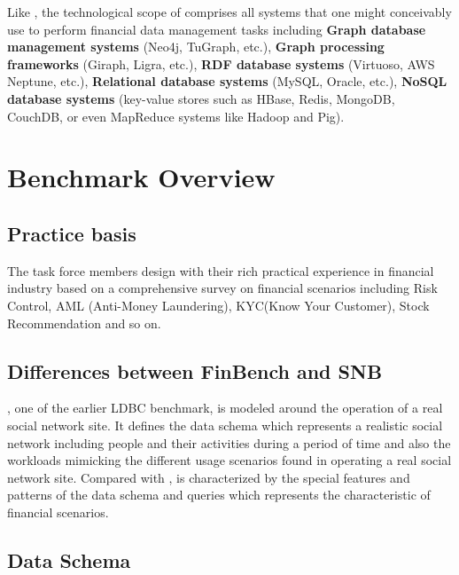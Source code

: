 Like \ldbcsnb, the technological scope of \ldbcfinbench comprises all systems that
one might conceivably use to perform financial data management tasks including
\textbf{Graph database management systems} (\eg Neo4j, TuGraph, etc.), \textbf{
    Graph processing frameworks} (\eg Giraph, Ligra, etc.), \textbf{RDF database
    systems} (\eg Virtuoso, AWS Neptune, etc.), \textbf{Relational database systems}
(\eg MySQL, Oracle, etc.), \textbf{NoSQL database systems} (\eg key-value stores
such as HBase, Redis, MongoDB, CouchDB, or even MapReduce systems like Hadoop
and Pig).


\section{Benchmark Overview}

\subsection{Practice basis}

The task force members design \ldbcfinbench with their rich practical experience in
financial industry based on a comprehensive survey on financial scenarios including
Risk Control, AML (Anti-Money Laundering), KYC(Know Your Customer), Stock Recommendation
and so on.

\subsection{Differences between FinBench and SNB}

\ldbcsnb, one of the earlier LDBC benchmark, is modeled around the operation of a real social network site. It defines the data schema which represents a realistic social network including people and their activities during a period of time and also the workloads mimicking the different usage scenarios found in operating a real social network site. Compared with \ldbcsnb, \ldbcfinbench is characterized by the special features and patterns of the data schema and queries which represents the characteristic of financial scenarios.

\subsection{Data Schema}

